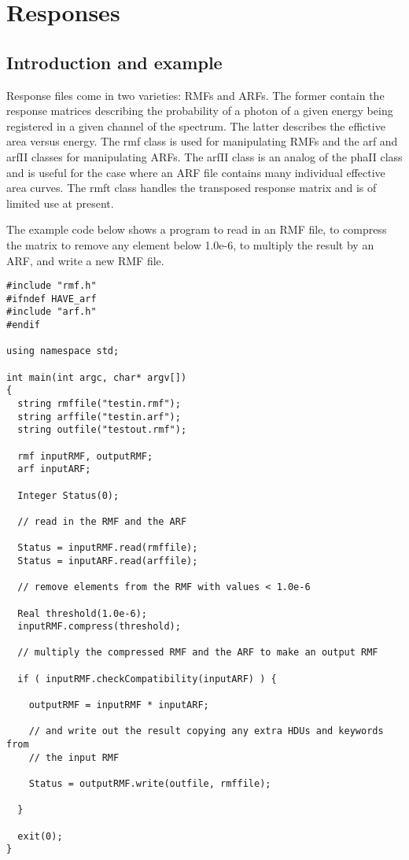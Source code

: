 \documentclass[11pt]{book}
\begin{document}
\section{Responses}

\subsection{Introduction and example}

Response files come in two varieties: RMFs and ARFs. The former
contain the response matrices describing the probability of a photon
of a given energy being registered in a given channel of the
spectrum. The latter describes the effictive area versus energy. The rmf
class is used for manipulating RMFs and the arf and arfII classes for
manipulating ARFs. The arfII class is an analog of the phaII class and
is useful for the case where an ARF file contains many individual
effective area curves. The rmft class handles the transposed response matrix
and is of limited use at present.

The example code below shows a program to read in an RMF file, to
compress the matrix to remove any element below 1.0e-6, to multiply
the result by an ARF, and write a new RMF file.

\begin{verbatim}
#include "rmf.h"
#ifndef HAVE_arf
#include "arf.h"
#endif

using namespace std;

int main(int argc, char* argv[])
{
  string rmffile("testin.rmf");
  string arffile("testin.arf");
  string outfile("testout.rmf");

  rmf inputRMF, outputRMF;
  arf inputARF;

  Integer Status(0);

  // read in the RMF and the ARF

  Status = inputRMF.read(rmffile);
  Status = inputARF.read(arffile);

  // remove elements from the RMF with values < 1.0e-6

  Real threshold(1.0e-6);
  inputRMF.compress(threshold);

  // multiply the compressed RMF and the ARF to make an output RMF

  if ( inputRMF.checkCompatibility(inputARF) ) {

    outputRMF = inputRMF * inputARF;

    // and write out the result copying any extra HDUs and keywords from
    // the input RMF
    
    Status = outputRMF.write(outfile, rmffile);

  }

  exit(0);
}

\end{verbatim}
\end{document}
